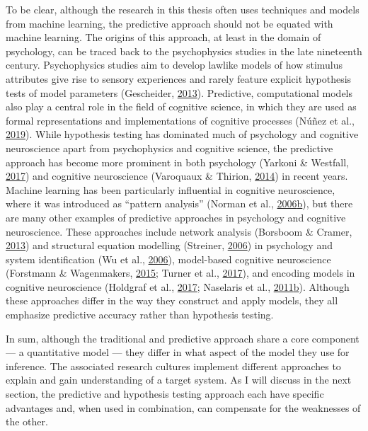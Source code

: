 \documentclass[11pt,american,]{memoir} %
\begin{document}
To be clear, although the research in this thesis often uses techniques and models from machine learning, the predictive approach should not be equated with machine learning. The origins of this approach, at least in the domain of psychology, can be traced back to the psychophysics studies in the late nineteenth century. Psychophysics studies aim to develop lawlike models of how stimulus attributes give rise to sensory experiences and rarely feature explicit hypothesis tests of model parameters (Gescheider, \protect\hyperlink{ref-Gescheider2013-zm}{2013}). Predictive, computational models also play a central role in the field of cognitive science, in which they are used as formal representations and implementations of cognitive processes (Núñez et al., \protect\hyperlink{ref-Nunez2019-lh}{2019}). While hypothesis testing has dominated much of psychology and cognitive neuroscience apart from psychophysics and cognitive science, the predictive approach has become more prominent in both psychology (Yarkoni \& Westfall, \protect\hyperlink{ref-Yarkoni2017-om}{2017}) and cognitive neuroscience (Varoquaux \& Thirion, \protect\hyperlink{ref-Varoquaux2014-su}{2014}) in recent years. Machine learning has been particularly influential in cognitive neuroscience, where it was introduced as ``pattern analysis'' (Norman et al., \protect\hyperlink{ref-Norman2006-bt}{2006}\protect\hyperlink{ref-Norman2006-bt}{b}), but there are many other examples of predictive approaches in psychology and cognitive neuroscience. These approaches include network analysis (Borsboom \& Cramer, \protect\hyperlink{ref-Borsboom2013-wb}{2013}) and structural equation modelling (Streiner, \protect\hyperlink{ref-Streiner2006-ze}{2006}) in psychology and system identification (Wu et al., \protect\hyperlink{ref-Wu2006-qs}{2006}), model-based cognitive neuroscience (Forstmann \& Wagenmakers, \protect\hyperlink{ref-Forstmann2015-rz}{2015}; Turner et al., \protect\hyperlink{ref-Turner2017-fi}{2017}), and encoding models in cognitive neuroscience (Holdgraf et al., \protect\hyperlink{ref-Holdgraf2017-eu}{2017}; Naselaris et al., \protect\hyperlink{ref-Naselaris2011-oh}{2011}\protect\hyperlink{ref-Naselaris2011-oh}{b}). Although these approaches differ in the way they construct and apply models, they all emphasize predictive accuracy rather than hypothesis testing.

In sum, although the traditional and predictive approach share a core component --- a quantitative model --- they differ in what aspect of the model they use for inference. The associated research cultures implement different approaches to explain and gain understanding of a target system. As I will discuss in the next section, the predictive and hypothesis testing approach each have specific advantages and, when used in combination, can compensate for the weaknesses of the other.
\end{document}
